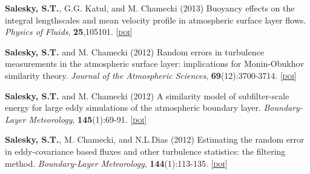 \documentclass[11pt,letterpaper]{article}
\begin{document}
\textbf{Salesky, S.T.}, G.G. Katul, and M. Chamecki (2013) Buoyancy effects on
the integral lengthscales and mean velocity profile in atmospheric surface
layer flows. \textit{Physics of Fluids}, \textbf{25},105101.
[\href{http://doi.org/10.1063/1.4823747}{\textsc{doi}}]

\textbf{Salesky, S.T.} and M. Chamecki (2012) Random errors in turbulence
measurements in the atmospheric surface layer: implications for Monin-Obukhov
similarity theory. \textit{Journal of the Atmospheric Sciences},
\textbf{69}(12):3700-3714.
[\href{http://doi.org/10.1175/JAS-D-12-096.1}{\textsc{doi}}]

\textbf{Salesky, S.T.} and M. Chamecki  (2012) A similarity model of
subfilter-scale energy for large eddy simulations of the atmospheric boundary
layer. \textit{Boundary-Layer Meteorology}, \textbf{145}(1):69-91.
[\href{http://doi.org/10.1007/s10546-011-9618-0}{\textsc{doi}}]

\textbf{Salesky, S.T.}, M. Chamecki, and N.L.Dias (2012) Estimating the random
error in eddy-covariance based fluxes and other turbulence statistics: the
filtering method. \textit{Boundary-Layer Meteorology}, \textbf{144}(1):113-135.
[\href{http://doi.org/10.1007/s10546-012-9710-0}{\textsc{doi}}]


\end{document}
